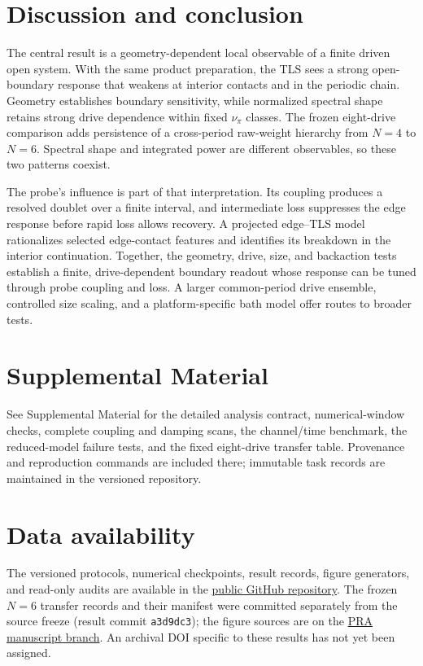 \documentclass[12pt]{article}
\begin{document}
\section{Discussion and conclusion}
\label{sec:discussion}

The central result is a geometry-dependent local observable of a finite driven open system. With the same product preparation, the TLS sees a strong open-boundary response that weakens at interior contacts and in the periodic chain. Geometry establishes boundary sensitivity, while normalized spectral shape retains strong drive dependence within fixed $\nu_\pi$ classes. The frozen eight-drive comparison adds persistence of a cross-period raw-weight hierarchy from $N=4$ to $N=6$. Spectral shape and integrated power are different observables, so these two patterns coexist.

The probe's influence is part of that interpretation. Its coupling produces a resolved doublet over a finite interval, and intermediate loss suppresses the edge response before rapid loss allows recovery. A projected edge--TLS model rationalizes selected edge-contact features and identifies its breakdown in the interior continuation. Together, the geometry, drive, size, and backaction tests establish a finite, drive-dependent boundary readout whose response can be tuned through probe coupling and loss. A larger common-period drive ensemble, controlled size scaling, and a platform-specific bath model offer routes to broader tests.

\section*{Supplemental Material}

See Supplemental Material for the detailed analysis contract, numerical-window checks, complete coupling and damping scans, the channel/time benchmark, the reduced-model failure tests, and the fixed eight-drive transfer table. Provenance and reproduction commands are included there; immutable task records are maintained in the versioned repository.

\section*{Data availability}
The versioned protocols, numerical checkpoints, result records, figure generators, and read-only audits are available in the \href{https://github.com/666888rwy-bit/floquet-tls-pi-edge-tls}{public GitHub repository}. The frozen $N=6$ transfer records and their manifest were committed separately from the source freeze (result commit \texttt{a3d9dc3}); the figure sources are on the \href{https://github.com/666888rwy-bit/floquet-tls-pi-edge-tls/tree/manuscript-pra-regular-article}{PRA manuscript branch}. An archival DOI specific to these results has not yet been assigned.
\end{document}
